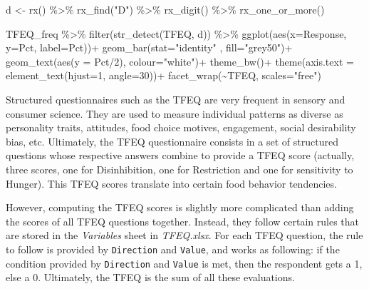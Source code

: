 \documentclass[
]{book}
\newenvironment{Shaded}{\begin{snugshade}}{\end{snugshade}}
\newcommand{\AttributeTok}[1]{\textcolor[rgb]{0.77,0.63,0.00}{#1}}
\newcommand{\DecValTok}[1]{\textcolor[rgb]{0.00,0.00,0.81}{#1}}
\newcommand{\FunctionTok}[1]{\textcolor[rgb]{0.00,0.00,0.00}{#1}}
\newcommand{\NormalTok}[1]{#1}
\newcommand{\OtherTok}[1]{\textcolor[rgb]{0.56,0.35,0.01}{#1}}
\newcommand{\SpecialCharTok}[1]{\textcolor[rgb]{0.00,0.00,0.00}{#1}}
\newcommand{\StringTok}[1]{\textcolor[rgb]{0.31,0.60,0.02}{#1}}
\begin{document}
\begin{Shaded}
\begin{Highlighting}[]
\NormalTok{d }\OtherTok{\textless{}{-}} \FunctionTok{rx}\NormalTok{() }\SpecialCharTok{\%\textgreater{}\%} 
  \FunctionTok{rx\_find}\NormalTok{(}\StringTok{"D"}\NormalTok{) }\SpecialCharTok{\%\textgreater{}\%} 
  \FunctionTok{rx\_digit}\NormalTok{() }\SpecialCharTok{\%\textgreater{}\%} 
  \FunctionTok{rx\_one\_or\_more}\NormalTok{()}

\NormalTok{TFEQ\_freq }\SpecialCharTok{\%\textgreater{}\%} 
  \FunctionTok{filter}\NormalTok{(}\FunctionTok{str\_detect}\NormalTok{(TFEQ, d)) }\SpecialCharTok{\%\textgreater{}\%} 
  \FunctionTok{ggplot}\NormalTok{(}\FunctionTok{aes}\NormalTok{(}\AttributeTok{x=}\NormalTok{Response, }\AttributeTok{y=}\NormalTok{Pct, }\AttributeTok{label=}\NormalTok{Pct))}\SpecialCharTok{+}
  \FunctionTok{geom\_bar}\NormalTok{(}\AttributeTok{stat=}\StringTok{"identity"}\NormalTok{ , }\AttributeTok{fill=}\StringTok{"grey50"}\NormalTok{)}\SpecialCharTok{+}
  \FunctionTok{geom\_text}\NormalTok{(}\FunctionTok{aes}\NormalTok{(}\AttributeTok{y =}\NormalTok{ Pct}\SpecialCharTok{/}\DecValTok{2}\NormalTok{), }\AttributeTok{colour=}\StringTok{"white"}\NormalTok{)}\SpecialCharTok{+}
  \FunctionTok{theme\_bw}\NormalTok{()}\SpecialCharTok{+}
  \FunctionTok{theme}\NormalTok{(}\AttributeTok{axis.text =} \FunctionTok{element\_text}\NormalTok{(}\AttributeTok{hjust=}\DecValTok{1}\NormalTok{, }\AttributeTok{angle=}\DecValTok{30}\NormalTok{))}\SpecialCharTok{+}
  \FunctionTok{facet\_wrap}\NormalTok{(}\SpecialCharTok{\textasciitilde{}}\NormalTok{TFEQ, }\AttributeTok{scales=}\StringTok{"free"}\NormalTok{)}
\end{Highlighting}
\end{Shaded}

Structured questionnaires such as the TFEQ are very frequent in sensory and consumer science. They are used to measure individual patterns as diverse as personality traits, attitudes, food choice motives, engagement, social desirability bias, etc. Ultimately, the TFEQ questionnaire consists in a set of structured questions whose respective answers combine to provide a TFEQ score (actually, three scores, one for Disinhibition, one for Restriction and one for sensitivity to Hunger). This TFEQ scores translate into certain food behavior tendencies.

However, computing the TFEQ scores is slightly more complicated than adding the scores of all TFEQ questions together. Instead, they follow certain rules that are stored in the \emph{Variables} sheet in \emph{TFEQ.xlsx}. For each TFEQ question, the rule to follow is provided by \texttt{Direction} and \texttt{Value}, and works as following: if the condition provided by \texttt{Direction} and \texttt{Value} is met, then the respondent gets a 1, else a 0. Ultimately, the TFEQ is the sum of all these evaluations.
\end{document}
